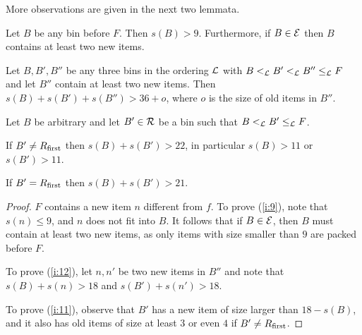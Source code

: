 More observations are given in the next two lemmata.

\begin{lem}
\label{l:aux}
\begin{compactenum}[(i)]
\item
\label{i:9}
Let $B$ be any bin before $F$. Then $s(B)>9$. Furthermore, if
$B\in{\mathcal E}$ then $B$ contains at least two new items.
\item
\label{i:12}
Let $B,B',B''$ be any three bins in the ordering ${\mathcal L}$ with
$B <_{{\mathcal L}} B' <_{{\mathcal L}} B'' \leq_{{\mathcal L}} F$ and let $B''$ contain at least two new items. Then
$s(B)+s(B')+s(B'')>36+o$, where $o$ is the size of old items in $B''$.
\item  
\label{i:11}
Let $B$ be arbitrary and let $B'\in{\mathcal R}$ be a bin such that $B <_{{\mathcal L}} B' \leq_{{\mathcal L}} F$.

If $B'\neq R_{\mbox{\rm\scriptsize first}}$ then $s(B)+s(B')>22$, in
particular $s(B)>11$ or $s(B')>11$.

If $B'=R_{\mbox{\rm\scriptsize first}}$ then $s(B)+s(B')>21$.
\end{compactenum}
\end{lem}

\begin{proof}
$F$ contains a new item $n$ different from $f$. To prove (\ref{i:9}),
  note that $s(n)\leq 9$, and $n$ does not fit into $B$. It follows
  that if $B\in{\mathcal E}$, then $B$ must contain at least two new items,
  as only items with size smaller than $9$ are packed before $F$.

To prove (\ref{i:12}), let $n,n'$ be two new items in $B''$ and note
that $s(B)+s(n)>18$ and $s(B')+s(n')>18$.

To prove (\ref{i:11}), observe that $B'$ has a new
item of size larger than $18-s(B)$, and it also has old items of size
at least $3$ or even $4$ if $B'\neq R_{\mbox{\rm\scriptsize first}}$.
\end{proof}

